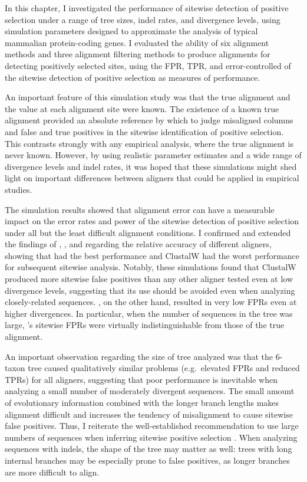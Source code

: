 In this chapter, I investigated the performance of sitewise detection
of positive selection under a range of tree sizes, indel rates, and
divergence levels, using simulation parameters designed to approximate
the analysis of typical mammalian protein-coding genes. I evaluated
the ability of six alignment methods and three alignment filtering
methods to produce alignments for detecting positively selected sites,
using the FPR, TPR, and error-controlled \tpr of the sitewise
detection of positive selection as measures of performance.


An important feature of this simulation study was that the true
alignment and the \omg value at each alignment site were known. The
existence of a known true alignment provided an absolute reference by
which to judge misaligned columns and false and true positives in the
sitewise identification of positive selection. This contrasts strongly
with any empirical analysis, where the true alignment is never
known. However, by using realistic parameter estimates and a wide
range of divergence levels and indel rates, it was hoped that these
simulations might shed light on important differences between aligners
that could be applied in empirical studies.


The simulation results showed that alignment error can have a
measurable impact on the error rates and power of the sitewise
detection of positive selection under all but the least difficult
alignment conditions. I confirmed and extended the findings of
\citet{Fletcher2010}, \citet{MarkovaRaina2011}, and
\citet{Privman2011Improving} regarding the relative accuracy of
different aligners, showing that \prankc had the best performance and
ClustalW had the worst performance for subsequent sitewise
analysis. Notably, these simulations found that ClustalW produced more
sitewise false positives than any other aligner tested even at low
divergence levels, suggesting that its use should be avoided even when
analyzing closely-related sequences. \prankc, on the other hand,
resulted in very low FPRs even at higher divergences. In particular,
when the number of sequences in the tree was large, \prankc{}'s
sitewise FPRs were virtually indistinguishable from those of the true
alignment.

An important observation regarding the size of tree analyzed was that
the 6-taxon tree caused qualitatively similar problems (e.g.\,
elevated FPRs and reduced TPRs) for all aligners, suggesting that poor
performance is inevitable when analyzing a small number of moderately
divergent sequences. The small amount of evolutionary information
combined with the longer branch lengths makes alignment difficult and
increases the tendency of misalignment to cause sitewise false
positives. Thus, I reiterate the well-established recommendation to
use large numbers of sequences when inferring sitewise positive
selection \citep{Anisimova2001,Anisimova2002}. When analyzing
sequences with indels, the shape of the tree may matter as well: trees
with long internal branches may be especially prone to false
positives, as longer branches are more difficult to align.

